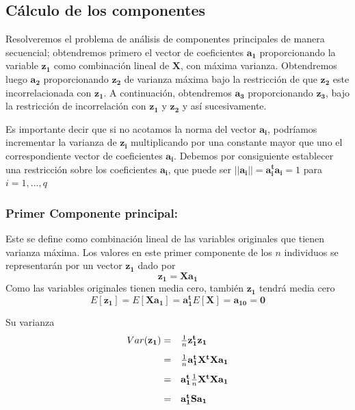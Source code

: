 \documentclass[12pt,letterpaper]{report} %
\begin{document}
\subsection{Cálculo de los componentes} 

Resolveremos el problema de análisis de componentes principales de manera secuencial; obtendremos primero el vector de coeficientes $\mathbf{a_1}$ proporcionando la variable $\mathbf{z_1}$ como combinación lineal de $\mathbf{X}$, con máxima varianza. Obtendremos luego $\mathbf{a_2}$ proporcionando $\mathbf{z_2}$ de varianza máxima bajo la restricción de que $\mathbf{z_2}$ este incorrelacionada con $\mathbf{z_1}$. A continuación, obtendremos $\mathbf{a_3}$ proporcionando $\mathbf{z_3}$, bajo la restricción de incorrelación con  $\mathbf{z_1}$ y  $\mathbf{z_2}$ y así sucesivamente.

Es importante decir que si no acotamos la norma del vector $\mathbf{a_i}$, podríamos incrementar la varianza de $\mathbf{z_i}$ multiplicando por una constante mayor que uno el correspondiente vector de coeficientes $\mathbf{a_i}$. Debemos por consiguiente establecer una restricción sobre los coeficientes $\mathbf{a_i}$, que puede ser $||\mathbf{a_i}||=\mathbf{a_i^ta_i}=1$ para $i=1,...,q$ 

\subsubsection{Primer Componente principal:} 

Este se define como combinación lineal de las variables originales que tienen varianza máxima. Los valores en este primer componente de los $n$ individuos se representarán por un vector $\mathbf{z_1}$ dado por
$$\mathbf{z_{1}}=\mathbf{Xa_1}$$
Como las variables originales tienen media cero, también $\mathbf{z_1}$ tendrá media cero
$$E[\mathbf{z_1}]=E[\mathbf{Xa_1}]=\mathbf{a_1^t}E[\mathbf{X}]=\mathbf{a_10}=\mathbf{0}$$

Su varianza
$$
\begin{array}{rl}
\vspace{3mm}Var(\mathbf{z_1}) = & \frac{1}{n} \mathbf{z_1^tz_1}\\ \vspace{3mm}
= & \frac{1}{n} \mathbf{a_1^tX^t}\mathbf{Xa_1}\\ \vspace{3mm}
= & \mathbf{a_1^t} \frac{1}{n} \mathbf{X^tXa_1} \\
= & \mathbf{a_1^t} \mathbf{Sa_1}
\end{array}
$$
\end{document}
